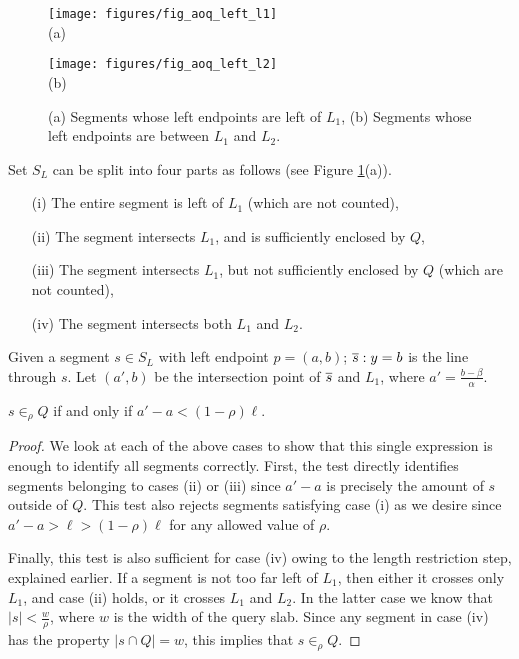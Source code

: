 \begin{figure}[h]
\begin{minipage}[b]{0.5\linewidth}
\centering
\texttt{[image: figures/fig\_aoq\_left\_l1]}\\
(a)
\end{minipage}
\begin{minipage}[b]{0.5\linewidth}
\centering
\texttt{[image: figures/fig\_aoq\_left\_l2]}\\
(b)
\end{minipage}
\caption{(a) Segments whose left endpoints are left of $L_1$, (b) Segments whose left endpoints are between $L_1$ and $L_2$.}
\label{fig:slabs:one:aoq_left_l1_l1l2}
\end{figure}

Set $S_L$ can be split into four parts as follows (see Figure \ref{fig:slabs:one:aoq_left_l1_l1l2}(a)).

\begin{itemize}
 \item[(i)] The entire segment is left of $L_1$ (which are not  counted),
 \item[(ii)] The segment intersects $L_1$, and is sufficiently enclosed by $Q$,
 \item[(iii)] The segment intersects $L_1$, but not sufficiently enclosed by 
 $Q$ (which are not counted),
 \item[(iv)] The segment intersects both $L_1$ and $L_2$. 
\end{itemize}

Given a segment $s \in S_L$ with left endpoint $p = (a,b)$; $\overline{s}: y = b$ 
is the line through $s$. Let $(a', b)$ be the intersection point of $\overline{s}$ 
and $L_1$, where $a' = \frac{b - \beta}{\alpha}$. 

\begin{observation}\label{o21}
 $s \in_\rho Q$ if and only if $a' - a < (1 - \rho)\ell$.
\end{observation}
\begin{proof}
We look at each of the above cases to show that this single expression is enough 
to identify all segments correctly. 
First, the test directly identifies segments belonging to cases (ii) or (iii) since 
$a' - a$ is precisely the amount of $s$ outside of $Q$. 
This test also rejects segments satisfying case (i) as we desire since $a' - a > \ell
> (1-\rho)\ell$ for any allowed value of $\rho$. 

Finally, this test is also sufficient for case (iv) owing to the length 
restriction step, explained earlier. If a segment is not too far left 
of $L_1$, then either it crosses only $L_1$, and case (ii) holds, or it 
crosses $L_1$ and $L_2$. In the latter case we know that $|s| < 
\frac{w}{\rho}$, where $w$ is the width of the query slab. Since any 
segment in case (iv) has the property $|s \cap Q| = w$, this implies that 
$s \in_\rho Q$.
\end{proof}

